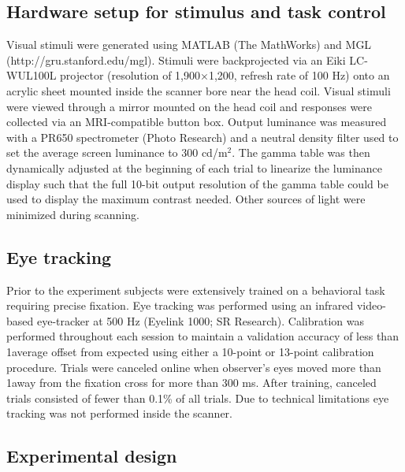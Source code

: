 \subsection{Hardware setup for stimulus and task control}

Visual stimuli were generated using MATLAB (The MathWorks) and MGL \citep{Gardner2018-uq} (http://gru.stanford.edu/mgl). Stimuli were backprojected via an Eiki LC-WUL100L projector (resolution of 1,900×1,200, refresh rate of 100 Hz) onto an acrylic sheet mounted inside the scanner bore near the head coil. Visual stimuli were viewed through a mirror mounted on the head coil and responses were collected via an MRI-compatible button box. Output luminance was measured with a PR650 spectrometer (Photo Research) and a neutral density filter used to set the average screen luminance to 300 cd/m$^2$. The gamma table was then dynamically adjusted at the beginning of each trial to linearize the luminance display such that the full 10-bit output resolution of the gamma table could be used to display the maximum contrast needed. Other sources of light were minimized during scanning.

\subsection{Eye tracking}

Prior to the experiment subjects were extensively trained on a behavioral task requiring precise fixation. Eye tracking was performed using an infrared video-based eye-tracker at 500 Hz (Eyelink 1000; SR Research). Calibration was performed throughout each session to maintain a validation accuracy of less than 1\degree  average offset from expected using either a 10-point or 13-point calibration procedure. Trials were canceled online when observer’s eyes moved more than 1\degree  away from the fixation cross for more than 300 ms. After training, canceled trials consisted of fewer than 0.1\% of all trials. Due to technical limitations eye tracking was not performed inside the scanner.

\subsection{Experimental design}

